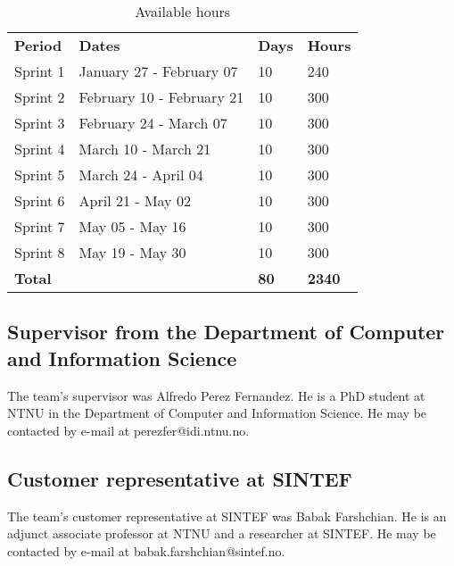 \begin{table}[H]
\centering
{}
\begin{tabular}{|l|l|l|l|}
\hline
\textbf{Period} & \textbf{Dates} & \textbf{Days} & \textbf{Hours}\\
Sprint 1& January 27 - February 07 & 10  & 240 \\
Sprint 2 & February 10 - February 21 &10  & 300 \\
Sprint 3 & February 24 - March 07 &10 & 300 \\
Sprint 4 & March 10 - March 21 &10  &300 \\
Sprint 5 & March 24 - April 04 &10&  300 \\
Sprint 6 & April 21 - May 02 &10  &300 \\
Sprint 7 & May 05 - May 16 &10  &300 \\
Sprint 8 & May 19 - May 30 &10  &300 \\
\textbf{Total}&& \textbf{80}&  \textbf{2340}\\\hline
\end{tabular}
\caption{Available hours}
\label{tab:availHours}
\end{table}


\subsection{Supervisor from the Department of Computer and Information Science}
The team's supervisor was Alfredo Perez Fernandez. He is a PhD student at NTNU in the Department of Computer and Information Science. He may be contacted by e-mail at perezfer@idi.ntnu.no.

\subsection{Customer representative at SINTEF}
The team's customer representative at SINTEF was Babak Farshchian. He is an adjunct associate professor at NTNU and a researcher at SINTEF. He may be contacted by e-mail at babak.farshchian@sintef.no.
